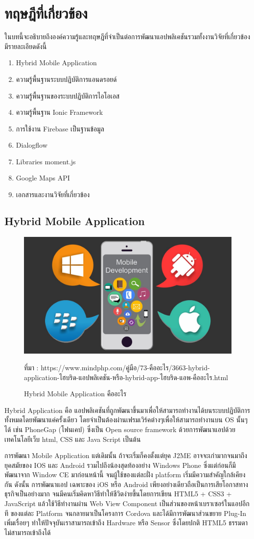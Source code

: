 \chapter{ทฤษฎีที่เกี่ยวข้อง}
ในบทนี้จะอธิบายถึงองค์ความรู้และทฤษฎีที่จำเป็นต่อการพัฒนาแอปพลิเคชันรวมทั้งงานวิจัยที่เกี่ยวข้อง มีรายละเอียดดังนี้
\begin{enumerate}[label=2.\arabic*]
	\item Hybrid Mobile Application
	\item ความรู้พื้นฐานระบบปฏิบัติการแอนดรอยด์
	\item ความรู้พื้นฐานของระบบปฏิบัติการไอโอเอส
	\item ความรู้พื้นฐาน Ionic Framework
	\item การใช้งาน Firebase เป็นฐานข้อมูล
	\item Dialogflow
	\item Libraries moment.js
	\item Google Maps API
	\item เอกสารและงานวิจัยที่เกี่ยวข้อง
\end{enumerate}

\section{Hybrid Mobile Application}

\begin{figure}[H]
	\centering
	\includegraphics[width=0.5\columnwidth]{Figures/2/hybrid}
	\caption{Hybrid Mobile Application คืออะไร}{ที่มา :  https://www.mindphp.com/คู่มือ/73-คืออะไร/3663-hybrid-application-ไฮบริด-แอปพลิเคชัน-หรือ-hybrid-app-ไฮบริด-แอพ-คืออะไร.html}
	\label{Fig:maketshare}
\end{figure}

Hybrid Application คือ แอปพลิเคชันที่ถูกพัฒนาขึ้นมาเพื่อให้สามารถทำงานได้บนระบบปฏิบัติการทั้งหมดโดยพัฒนาแค่ครั้งเดียว 
โดยจำเป็นต้องผ่านเฟรมเวิร์คต่างๆเพื่อให้สามารถทำงานบน OS นั้นๆได้ เช่น PhoneGap (โฟนเคป) ซึ่งเป็น Open source framework 
ด้วยการพัฒนาแอปด้วยเทคโนโลยีเว็บ html, CSS และ Java Script เป็นต้น 

การพัฒนา Mobile Application แต่เดิมนั้น ถ้าจะเริ่มก็คงตั้งแต่ยุค J2ME อาจจะเก่ามากจนมาถึงยุคสมัยของ IOS และ Android 
รวมไปถึงน้องสุดท้องอย่าง Windows Phone 
ซึ่งแต่ก่อนก็มีพัฒนาจาก Window CE มาก่อนหน้านี้ จนผู้ใช้ของแต่ละฝั่ง platform เริ่มมีความสำคัญใกล้เคียงกัน ดังนั้น การพัฒนาแอป
เฉพาะของ iOS หรือ Android เพียงอย่างเดียวถือเป็นการเสียโอกาสทางธุรกิจเป็นอย่างมาก จนมีคนเริ่มคิดหาวิธีทำให้ชีวิตง่ายขึ้นโดยการเขียน 
HTML5 + CSS3 + JavaScript แล้วใช้วิธีทำงานผ่าน Web View Component เป็นส่วนของหน้าเบราเซอร์ในแอปอีกที ของแต่ละ Platform 
จนกลายมาเป็นโครงการ Cordova และได้มีการพัฒนาส่วนขยาย Plug-In เพิ่มเรื่อยๆ ทำให้ปัจจุบันเราสามารถเข้าถึง Hardware หรือ Sensor 
ซึ่งโดยปกติ HTML5 ธรรมดาไม่สามารถเข้าถึงได้ 

